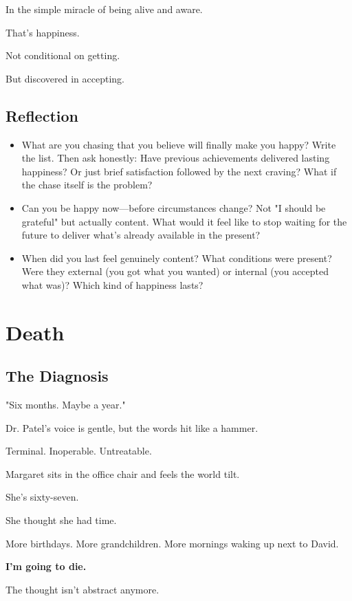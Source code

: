 \documentclass[11pt,twoside]{book}
\begin{document}
In the simple miracle of being alive and aware.

That's happiness.

Not conditional on getting.

But discovered in accepting.

\section*{Reflection}

\begin{itemize}
\item What are you chasing that you believe will finally make you happy? Write the list. Then ask honestly: Have previous achievements delivered lasting happiness? Or just brief satisfaction followed by the next craving? What if the chase itself is the problem?
\item Can you be happy now—before circumstances change? Not "I should be grateful" but actually content. What would it feel like to stop waiting for the future to deliver what's already available in the present?
\item When did you last feel genuinely content? What conditions were present? Were they external (you got what you wanted) or internal (you accepted what was)? Which kind of happiness lasts?
\end{itemize}

\chapter{Death}

\section*{The Diagnosis}

"Six months. Maybe a year."

Dr. Patel's voice is gentle, but the words hit like a hammer.

Terminal. Inoperable. Untreatable.

Margaret sits in the office chair and feels the world tilt.

She's sixty-seven.

She thought she had time.

More birthdays. More grandchildren. More mornings waking up next to David.

\textbf{I'm going to die.}

The thought isn't abstract anymore.
\end{document}
